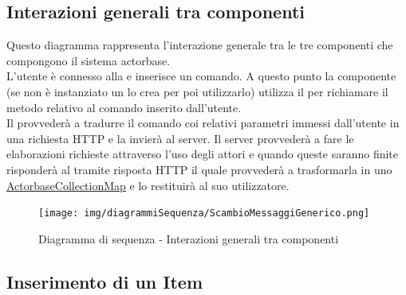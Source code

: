 \documentclass{scalatekids-article}
\begin{document}
\subsection{Interazioni generali tra componenti}
Questo diagramma rappresenta l'interazione generale tra le tre componenti che
compongono il sistema actorbase.\\
L'utente è connesso alla  e inserisce un comando. A questo punto la
componente  (se non è instanziato un  lo crea per poi
utilizzarlo) utilizza il  per richiamare il metodo relativo al
comando inserito dall'utente.\\Il {} provvederà a tradurre il
comando coi relativi parametri immessi dall'utente in una richiesta HTTP
e la invierà al server. Il server provvederà a fare le elaborazioni richieste attraverso l'uso
degli attori e quando queste saranno finite risponderà al 
tramite risposta HTTP il quale provvederà a trasformarla in uno
\hyperref[sec:driver::actorbasedata::ActorbaseCollectionMap]{ActorbaseCollectionMap} e lo
restituirà al suo utilizzatore.
\begin{figure}[H]
  \begin{center}
    \texttt{[image: img/diagrammiSequenza/ScambioMessaggiGenerico.png]}
    \caption{Diagramma di sequenza - Interazioni generali tra componenti}
  \end{center}
\end{figure}

\subsection{Inserimento di un Item}
\end{document}
